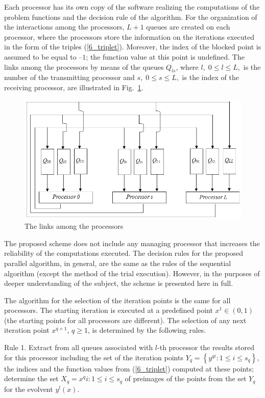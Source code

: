 Each processor has its own copy of the software realizing the computations of the problem functions and the decision rule of the algorithm. For the organization of the interactions among the processors, $L+1$ queues are created on each processor, where the processors store the information on the iterations executed in the form of the triples (\ref{6_triplet}). Moreover, the index of the blocked point is assumed to be equal to $–1$; the function value at this point is undefined. The links among the processors by means of the queues $Q_{ls}$, where $l,\; 0\leq l \leq L,$ is the number of the transmitting processor and $s,\; 0 \leq s \leq L,$ is the index of the receiving processor, are illustrated in Fig.~\ref{6_fig_7}.

\begin{figure}[t]
\includegraphics[width=0.8\linewidth]{figures/6_7.png}
\caption{The links among the processors }
\label{6_fig_7}     
\end{figure}

The proposed scheme does not include any managing processor that increases the reliability of the computations executed. The decision rules for the proposed parallel algorithm, in general, are the same as the rules of the sequential algorithm (except the method of the trial execution). However, in the purposes of deeper understanding of the subject, the scheme is presented here in full.

The algorithm for the selection of the iteration points is the same for all processors. The starting iteration is executed at a predefined point $x^1 \in (0,1)$ (the starting points for all processors are different). The selection of any next iteration point $x^{q+1}$, $q \geq 1$, is determined by the following rules.

Rule 1. Extract from all queues associated with $l$-th processor the results stored for this processor including the set of the iteration points $Y_q=\left\{y^{qi}:1 \leq i \leq s_q\right\}$,  the indices and the function values from (\ref{6_triplet}) computed at these points; determine the set $X_q={x^qi:1\leq i \leq s_q}$ of preimages of the points from the set $Y_q$ for the evolvent $y^l(x)$.

